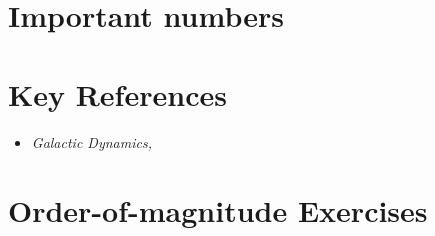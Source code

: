 \section{Important numbers}

\section{Key References}

\begin{itemize}
  \item
    {\it Galactic
    Dynamics, \href{https://ui.adsabs.harvard.edu/abs/2009PhT....62e..56B/abstract}{\citet{binney09a}}}
\end{itemize}

\section{Order-of-magnitude Exercises}

